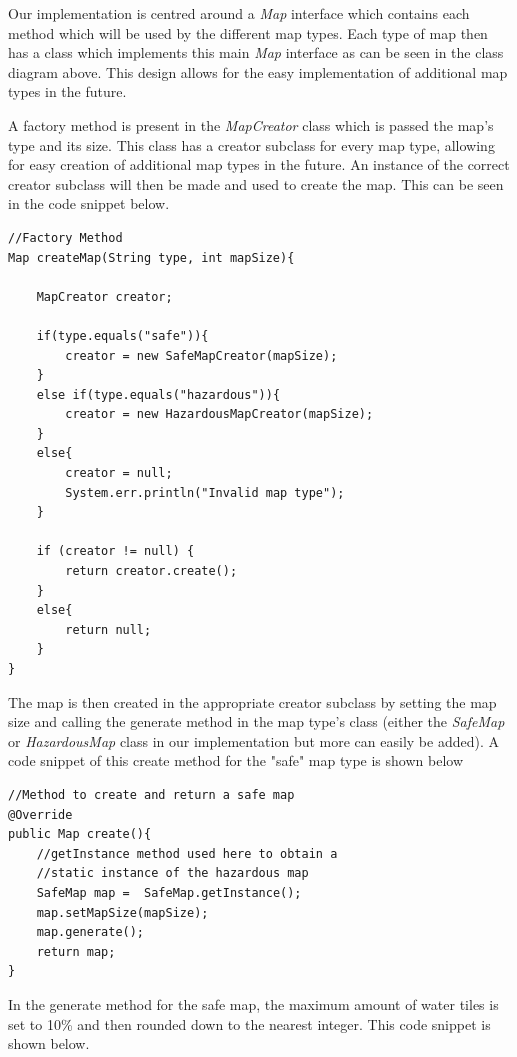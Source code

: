 \documentclass[a4paper,12pt]{extarticle}
\begin{document}
\newpage

\noindent Our implementation is centred around a \textit{Map} interface which contains each method which will be used by the different map types. Each type of map then has a class which implements this main \textit{Map} interface as can be seen in the class diagram above. This design allows for the easy implementation of additional map types in the future.\par

A factory method is present in the \textit{MapCreator} class which is passed the map's type and its size. This class has a creator subclass for every map type, allowing for easy creation of additional map types in the future. An instance of the correct creator subclass will then be made and used to create the map. This can be seen in the code snippet below.

\vspace{-1mm}
\begin{lstlisting}
//Factory Method
Map createMap(String type, int mapSize){

    MapCreator creator;

    if(type.equals("safe")){
        creator = new SafeMapCreator(mapSize);
    }
    else if(type.equals("hazardous")){
        creator = new HazardousMapCreator(mapSize);
    }
    else{
        creator = null;
        System.err.println("Invalid map type");
    }

    if (creator != null) {
        return creator.create();
    }
    else{
        return null;
    }
}
\end{lstlisting}
\vspace{4mm}

\noindent The map is then created in the appropriate creator subclass by setting the map size and calling the generate method in the map type's class (either the \textit{SafeMap} or \textit{HazardousMap} class in our implementation but more can easily be added). A code snippet of this create method for the "safe" map type is shown below

\vspace{-1mm}
\begin{lstlisting}
//Method to create and return a safe map
@Override
public Map create(){
    //getInstance method used here to obtain a 
    //static instance of the hazardous map
    SafeMap map =  SafeMap.getInstance();
    map.setMapSize(mapSize);
    map.generate();
    return map;
}
\end{lstlisting}

\noindent In the generate method for the safe map, the maximum amount of water tiles is set to 10\% and then rounded down to the nearest integer. This code snippet is shown below.
\end{document}
